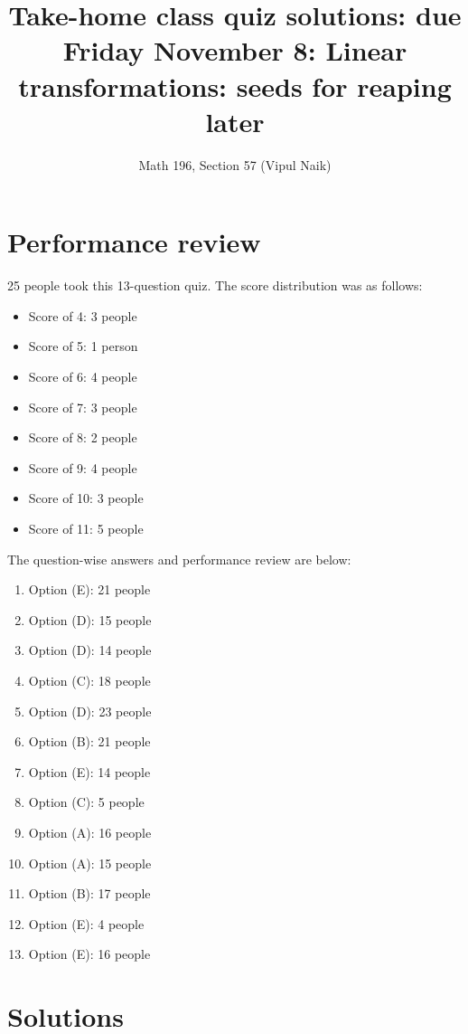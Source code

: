 \documentclass[10pt]{amsart}
\title{Take-home class quiz solutions: due Friday November 8: Linear transformations: seeds for reaping later}
\author{Math 196, Section 57 (Vipul Naik)}
\begin{document}
\maketitle

\section{Performance review}

25 people took this 13-question quiz. The score distribution was as follows:

\begin{itemize}
\item Score of 4: 3 people
\item Score of 5: 1 person
\item Score of 6: 4 people
\item Score of 7: 3 people
\item Score of 8: 2 people
\item Score of 9: 4 people
\item Score of 10: 3 people
\item Score of 11: 5 people
\end{itemize}

The question-wise answers and performance review are below:

\begin{enumerate}
\item Option (E): 21 people
\item Option (D): 15 people
\item Option (D): 14 people
\item Option (C): 18 people
\item Option (D): 23 people
\item Option (B): 21 people
\item Option (E): 14 people
\item Option (C): 5 people
\item Option (A): 16 people
\item Option (A): 15 people
\item Option (B): 17 people
\item Option (E): 4 people
\item Option (E): 16 people
\end{enumerate}

\section{Solutions}
\end{document}
